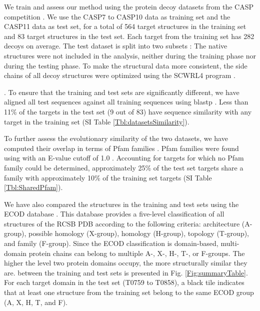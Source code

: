 
We train and assess our method using the protein decoy datasets from
the CASP competition \cite{moult2014critical}.  We use the CASP7 to
CASP10 data as training set and the CASP11 data as test set, for a
total of 564 target structures in the training set and 83 target
structures in the test set. Each target from the training set has 282
decoys on average.
%
The test dataset is split into two subsets \cite{kryshtafovych2015}:
%
The native structures were not included in the analysis, neither
during the training phase nor during the testing phase. To make the
structural data more consistent, the side chains of all decoy
structures were optimized using the SCWRL4 program
\cite{krivov2009improved}.

. 
To ensure that the training and test sets are significantly different, we have aligned all test
sequences against all training sequences using blastp \cite{altschul1990basic}. 
Less than 11\% of the targets in the test set (9 out of 83) have sequence
similarity with any target in the training set (SI Table \ref{Tbl:datasetsSimilarity}).

To further assess the evolutionary similarity of the two datasets, we
have computed their overlap in terms of Pfam families
\cite{finn2016pfam}. Pfam families were found using 
with an E-value cutoff of 1.0 \cite{finn2016pfam}.  
Accounting for targets for which no Pfam family could
be determined, approximately 25\% of the test set targets share a
family with approximately 10\% of the training set targets (SI Table \ref{Tbl:SharedPfam}).

We have also compared the structures in the training and test sets
using the ECOD database \cite{cheng2014ecod}. This database provides a
five-level classification of all structures of the RCSB PDB
\cite{berman2000protein} according to the following criteria:
architecture (A-group), possible homology (X-group), homology
(H-group), topology (T-group), and family (F-group).  Since the ECOD
classification is domain-based, multi-domain protein chains can belong
to multiple A-, X-, H-, T-, or F-groups.  The higher the level two
protein domains occupy, the more structurally similar they are.
%
 between the training and test sets
is presented in Fig. \ref{Fig:summaryTable}. For each target domain in
the test set (T0759 to T0858), a black tile indicates that at least
one structure from the training set belong to the same ECOD group (A,
X, H, T, and F). 
%

